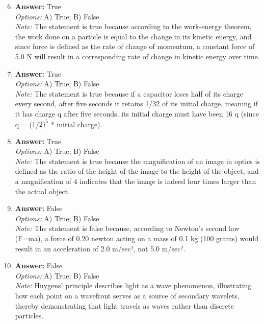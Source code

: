 \documentclass[12pt]{article}
\begin{document}
\begin{enumerate}[label=\arabic*.]
\setcounter{enumi}{5}
\item \textbf{Answer:} True
\\ \textit{Options:} A) True; B) False
\\ \textit{Note:} The statement is true because according to the work-energy theorem, the work done on a particle is equal to the change in its kinetic energy, and since force is defined as the rate of change of momentum, a constant force of 5.0 N will result in a corresponding rate of change in kinetic energy over time.
\item \textbf{Answer:} True
\\ \textit{Options:} A) True; B) False
\\ \textit{Note:} The statement is true because if a capacitor loses half of its charge every second, after five seconds it retains 1/32 of its initial charge, meaning if it has charge q after five seconds, its initial charge must have been 16 q (since q = (1/$2)^5$ * initial charge).
\item \textbf{Answer:} True
\\ \textit{Options:} A) True; B) False
\\ \textit{Note:} The statement is true because the magnification of an image in optics is defined as the ratio of the height of the image to the height of the object, and a magnification of 4 indicates that the image is indeed four times larger than the actual object.
\item \textbf{Answer:} False
\\ \textit{Options:} A) True; B) False
\\ \textit{Note:} The statement is false because, according to Newton's second law (F=ma), a force of 0.20 newton acting on a mass of 0.1 kg (100 grams) would result in an acceleration of 2.0 m/sec², not 5.0 m/sec².
\item \textbf{Answer:} False
\\ \textit{Options:} A) True; B) False
\\ \textit{Note:} Huygens' principle describes light as a wave phenomenon, illustrating how each point on a wavefront serves as a source of secondary wavelets, thereby demonstrating that light travels as waves rather than discrete particles.
\end{enumerate}
\end{document}
